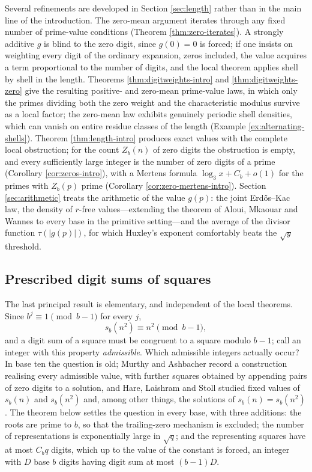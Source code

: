 \documentclass[11pt,reqno]{amsart}
\theoremstyle{plain}
\theoremstyle{definition}
\newcommand{\1}{\mathbf 1}
\begin{document}
Several refinements are developed in Section \ref{sec:length} rather than in the main line of the introduction. The zero-mean argument iterates through any fixed number of prime-value conditions (Theorem \ref{thm:zero-iterates}). A strongly additive $g$ is blind to the zero digit, since $g(0)=0$ is forced; if one insists on weighting every digit of the ordinary expansion, zeros included, the value acquires a term proportional to the number of digits, and the local theorem applies shell by shell in the length. Theorems \ref{thm:digitweights-intro} and \ref{thm:digitweights-zero} give the resulting positive- and zero-mean prime-value laws, in which only the primes dividing both the zero weight and the characteristic modulus survive as a local factor; the zero-mean law exhibits genuinely periodic shell densities, which can vanish on entire residue classes of the length (Example \ref{ex:alternating-shells}). Theorem \ref{thm:length-intro} produces exact values with the complete local obstruction; for the count $Z_b(n)$ of zero digits the obstruction is empty, and every sufficiently large integer is the number of zero digits of a prime (Corollary \ref{cor:zeros-intro}), with a Mertens formula $\log_3x+C_b+o(1)$ for the primes with $Z_b(p)$ prime (Corollary \ref{cor:zero-mertens-intro}). Section \ref{sec:arithmetic} treats the arithmetic of the value $g(p)$: the joint Erd\H{o}s--Kac law, the density of $r$-free values---extending the theorem of Aloui, Mkaouar and Wannes \cite{aloui} to every base in the primitive setting---and the average of the divisor function $\tau(|g(p)|)$, for which Huxley's exponent \cite{huxley} comfortably beats the $\sqrt y$ threshold.

\subsection{Prescribed digit sums of squares}
The last principal result is elementary, and independent of the local theorems. Since $b^j\equiv1\pmod{b-1}$ for every $j$,
\[
 s_b(n^2)\equiv n^2\pmod{b-1},
\]
and a digit sum of a square must be congruent to a square modulo $b-1$; call an integer with this property \emph{admissible}. Which admissible integers actually occur? In base ten the question is old; Murthy and Ashbacher \cite[pp.~154--156]{murthyashbacher} record a construction realising every admissible value, with further squares obtained by appending pairs of zero digits to a solution, and Hare, Laishram and Stoll \cite{harelaishramstoll} studied fixed values of $s_b(n)$ and $s_b(n^2)$ and, among other things, the solutions of $s_b(n)=s_b(n^2)$. The theorem below settles the question in every base, with three additions: the roots are prime to $b$, so that the trailing-zero mechanism is excluded; the number of representations is exponentially large in $\sqrt q$; and the representing squares have at most $C_bq$ digits, which up to the value of the constant is forced, an integer with $D$ base $b$ digits having digit sum at most $(b-1)D$.
\end{document}

